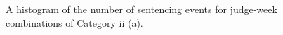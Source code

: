 \documentclass[11pt, oneside]{article}   	%
\theoremstyle{ModifiedStyle}
\begin{document}
\begin{figure}[H]
\begin{minipage}{0.45\textwidth}
		\vspace{-6mm}
		\caption{A histogram of the number of sentencing events for judge-week combinations of Category ii (a).}
		\label{Figure_Histogram_of_Sentences_This_Week_Category_10}
	\end{minipage}
\end{figure}

\end{document}
